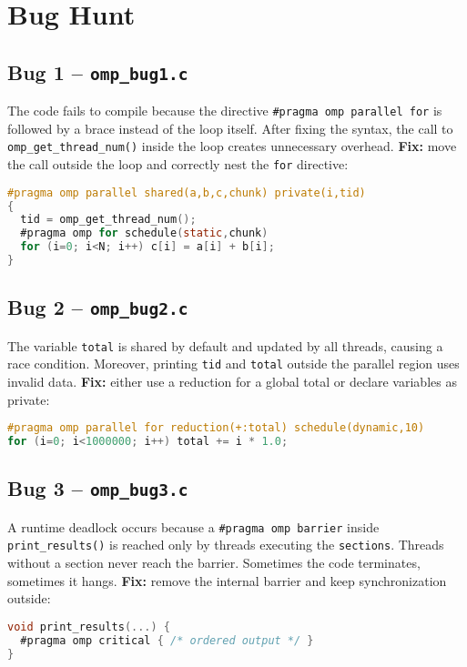 \section{Bug Hunt }

\subsection*{Bug 1 – \texttt{omp\_bug1.c}}
The code fails to compile because the directive
\texttt{\#pragma omp parallel for} is followed by a brace instead of the loop itself.
After fixing the syntax, the call to \texttt{omp\_get\_thread\_num()} inside the loop
creates unnecessary overhead.  
\textbf{Fix:} move the call outside the loop and correctly nest the \texttt{for} directive:
\begin{lstlisting}[language=C]
#pragma omp parallel shared(a,b,c,chunk) private(i,tid)
{
  tid = omp_get_thread_num();
  #pragma omp for schedule(static,chunk)
  for (i=0; i<N; i++) c[i] = a[i] + b[i];
}
\end{lstlisting}

\subsection*{Bug 2 – \texttt{omp\_bug2.c}}
The variable \texttt{total} is shared by default and updated by all threads,
causing a race condition. Moreover, printing \texttt{tid} and \texttt{total}
outside the parallel region uses invalid data.  
\textbf{Fix:} either use a reduction for a global total or declare variables as private:
\begin{lstlisting}[language=C]
#pragma omp parallel for reduction(+:total) schedule(dynamic,10)
for (i=0; i<1000000; i++) total += i * 1.0;
\end{lstlisting}

\subsection*{Bug 3 – \texttt{omp\_bug3.c}}
A runtime deadlock occurs because a \texttt{\#pragma omp barrier}
inside \texttt{print\_results()} is reached only by threads executing the
\texttt{sections}. Threads without a section never reach the barrier.
Sometimes the code terminates, sometimes it hangs.  
\textbf{Fix:} remove the internal barrier and keep synchronization outside:
\begin{lstlisting}[language=C]
void print_results(...) {
  #pragma omp critical { /* ordered output */ }
}
\end{lstlisting}

